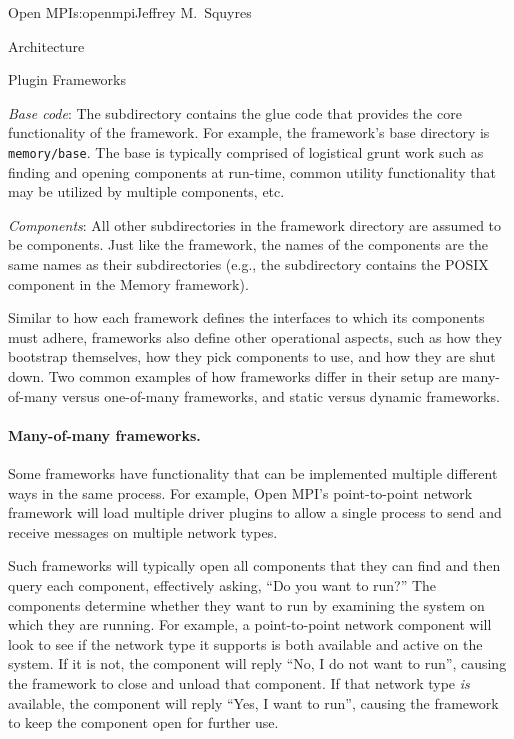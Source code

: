 \begin{aosachapter}{Open MPI}{s:openmpi}{Jeffrey M.\ Squyres}
\begin{aosasect1}{Architecture}
\begin{aosasect2}{Plugin Frameworks}
\begin{aosaenumerate}
\item \emph{Base code}: The  subdirectory contains the glue
  code that provides the core functionality of the framework.  For
  example, the  framework's base directory is {\tt
    memory/base}.  The base is typically comprised of logistical grunt
  work such as finding and opening components at run-time, common
  utility functionality that may be utilized by multiple components,
  etc.

\item \emph{Components}: All other subdirectories in the framework
  directory are assumed to be components.  Just like the framework,
  the names of the components are the same names as their
  subdirectories (e.g., the  subdirectory contains
  the POSIX component in the Memory framework).
\end{aosaenumerate}

Similar to how each framework defines the interfaces to which its
components must adhere, frameworks also define other operational
aspects, such as how they bootstrap themselves, how they pick
components to use, and how they are shut down.  Two common examples of
how frameworks differ in their setup are many-of-many versus one-of-many
frameworks, and static versus dynamic frameworks.


\paragraph{Many-of-many frameworks.} 

Some frameworks have functionality that can be implemented multiple
different ways in the same process.
%
For example, Open MPI's point-to-point network framework will load
multiple driver plugins to allow a single process to send and receive
messages on multiple network types.

Such frameworks will typically open all components that they can find
and then query each component, effectively asking, ``Do you want to
run?''  
%
The components determine whether they want to run by examining the
system on which they are running.
%
For example, a point-to-point network component will look to see if
the network type it supports is both available and active on the
system.
%
If it is not, the component will reply ``No, I do not want to run'',
causing the framework to close and unload that component.
% 
If that network type \emph{is} available, the component will reply
``Yes, I want to run'', causing the framework to keep the component
open for further use.


\end{aosasect2}
\end{aosasect1}
\end{aosachapter}
